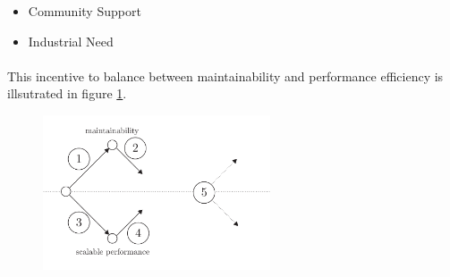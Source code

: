 \begin{itemize}
\item Community Support
\item Industrial Need
\end{itemize}

\paragraph{}

This incentive to balance between maintainability and performance efficiency is illsutrated in figure \ref{fig:state-of-the-art}.

\begin{figure}[h!] \label{fig:state-of-the-art}
\begin{center}
\includegraphics[width=0.6\textwidth]{../ressources/state-of-the-art.pdf}
\end{center}
\end{figure}